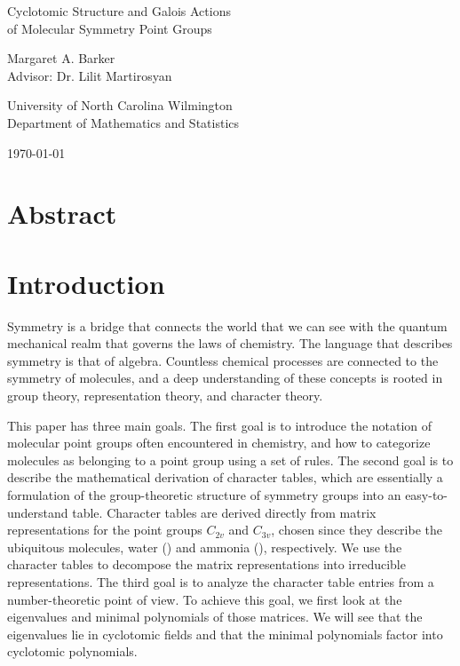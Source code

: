 \documentclass{article}
\begin{document}
    \thispagestyle{empty}
    
    \begin{center}
        {\huge Cyclotomic Structure and Galois Actions\\\vspace{0.25em}of Molecular Symmetry Point Groups}\vspace{1cm}
        
        {\large Margaret A. Barker\\Advisor: Dr. Lilit Martirosyan\vspace{1cm}
        
        University of North Carolina Wilmington\\Department of Mathematics and Statistics\vspace{1cm}
        
        \today}
    \end{center}

    \vfill

    \section*{Abstract}

    

    \pagebreak

    \tableofcontents

    \pagebreak

    \section{Introduction}

    Symmetry is a bridge that connects the world that we can see with the quantum mechanical realm that governs the laws of chemistry. The language that describes symmetry is that of algebra. Countless chemical processes are connected to the symmetry of molecules, and a deep understanding of these concepts is rooted in group theory, representation theory, and character theory.

    This paper has three main goals. The first goal is to introduce the notation of molecular point groups often encountered in chemistry, and how to categorize molecules as belonging to a point group using a set of rules. The second goal is to describe the mathematical derivation of character tables, which are essentially a formulation of the group-theoretic structure of symmetry groups into an easy-to-understand table. Character tables are derived directly from matrix representations for the point groups $C_{2v}$ and $C_{3v}$, chosen since they describe the ubiquitous molecules, water () and ammonia (), respectively. We use the character tables to decompose the matrix representations into irreducible representations. The third goal is to analyze the character table entries from a number-theoretic point of view. To achieve this goal, we first look at the eigenvalues and minimal polynomials of those matrices. We will see that the eigenvalues lie in cyclotomic fields and that the minimal polynomials factor into cyclotomic polynomials.
\end{document}
